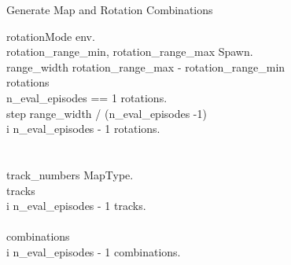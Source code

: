 \renewcommand{\thepseudonum}{\roman{pseudonum}}
\begin{pseudocode}{Generate Map and Rotation Combinations}{ }


    rotationMode \GETS env.\\
    rotation\_range\_min, rotation\_range\_max \GETS Spawn.\\

    range\_width \GETS rotation\_range\_max - rotation\_range\_min\\
    rotations \GETS []\\

    \IF n\_eval\_episodes == 1 \THEN
    rotations.\\
    \ELSE
    \BEGIN
    step \GETS range\_width / (n\_eval\_episodes -1)\\
    \FOR i  \TO n\_eval\_episodes - 1 \DO
    \BEGIN
    rotations.\\
    \END\\
    \END\\

    track\_numbers \GETS MapType.\\
    tracks \GETS []\\
    \FOR i  \TO n\_eval\_episodes - 1 \DO
    \BEGIN
    tracks.\\
    \END\\

    combinations \GETS []\\
    \FOR i  \TO n\_eval\_episodes - 1 \DO
    \BEGIN
    combinations.\\
    \END\\

    \ENDPROCEDURE
    \label{fig:generate_track_rotation}
\end{pseudocode}




